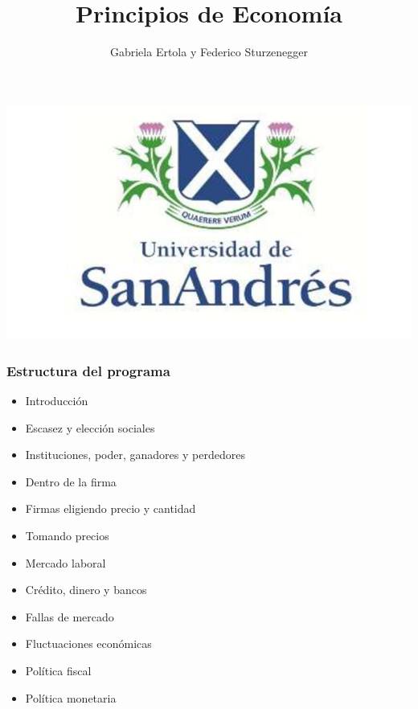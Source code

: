 \documentclass{beamer}
\title[Principios de Economía]{Principios de Economía}
\date{}
\author[Ertola y Sturzenegger]{Gabriela Ertola y Federico Sturzenegger }
\institute[]{Universidad de San Andrés \\
2022}
\begin{document}
\begin{frame}
\titlepage
\centering
\includegraphics[scale=0.25]{Figures/logoUDESA.jpg} 
\end{frame}

\begin{frame}
\frametitle{Estructura del programa}
\begin{itemize}
\begin{itemize}
    \item Introducción
    \item Escasez y elección
    \itemInteracciones sociales
    \item Instituciones, poder, ganadores y perdedores
    \item Dentro de la firma
    \item Firmas eligiendo precio y cantidad
    \item Tomando precios
    \item Mercado laboral
    \item Crédito, dinero y bancos
    \item Fallas de mercado
    \item Fluctuaciones económicas
    \item Política fiscal
    \item Política monetaria
\end{itemize}
\end{itemize}
\end{frame}
\end{document}
